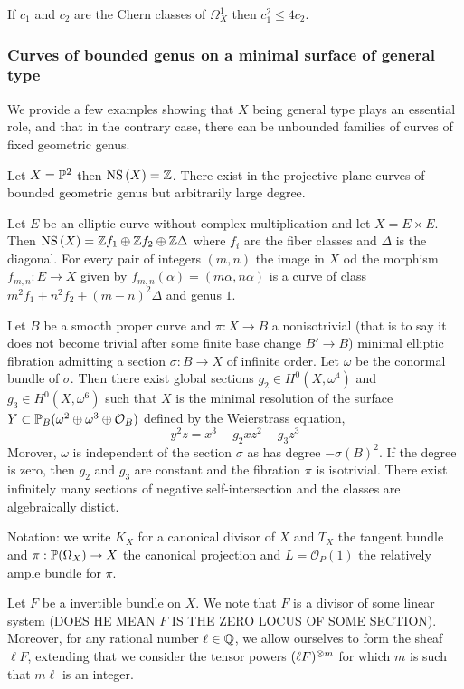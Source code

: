 \documentclass[12pt]{article}
\newcommand{\cO}{\mathcal{O}}
\begin{document}
\begin{cor}
If $c_1$ and $c_2$ are the Chern classes of $\Omega^1_X$ then $c_1^2 \le 4 c_2$. 
\end{cor}

\subsubsection{Curves of bounded genus on a minimal surface of general type}

We provide a few examples showing that $X$ being general type plays an essential role, and that in the contrary case, there can be unbounded families of curves of fixed geometric genus.

\begin{example}
Let $X = \P^2$ then $\NS{X} = \Z$. There exist in the projective plane curves of bounded geometric genus but arbitrarily large degree.
\end{example} 

\begin{example}
Let $E$ be an elliptic curve without complex multiplication and let $X = E \times E$. Then $\NS{X} = \Z f_1 \oplus \Z f_2 \oplus \Z \Delta$ where $f_i$ are the fiber classes and $\Delta$ is the diagonal. For every pair of integers $(m, n)$ the image in $X$ od the morphism $f_{m,n} : E \to X$ given by $f_{m,n}(\alpha) = (m \alpha, n \alpha)$ is a curve of class $m^2 f_1 + n^2 f_2 + (m-n)^2 \Delta$ and genus $1$.
\end{example}

\begin{example}
Let $B$ be a smooth proper curve and $\pi : X \to B$ a nonisotrivial (that is to say it does not become trivial after some finite base change $B' \to B$) minimal elliptic fibration admitting a section $\sigma : B \to X$ of infinite order. Let $\omega$ be the conormal bundle of $\sigma$. Then there exist global sections $g_2 \in H^0(X, \omega^4)$ and $g_3 \in H^0(X, \omega^6)$ such that $X$ is the minimal resolution of the surface $Y \subset \P_B(\omega^2 \oplus \omega^3 \oplus \cO_B)$ defined by the Weierstrass equation,
\[ y^2 z = x^3 - g_2 x z^2 - g_3 z^3 \]
Morover, $\omega$ is independent of the section $\sigma$ as has degree $- \sigma(B)^2$. If the degree is zero, then $g_2$ and $g_3$ are constant and the fibration $\pi$ is isotrivial. There exist infinitely many sections of negative self-intersection and the classes are algebraically distict. 
\end{example}

Notation: we write $K_X$ for a canonical divisor of $X$ and $T_X$ the tangent bundle and $\pi : \P(\Omega_X) \to X$ the canonical projection and $L = \cO_P(1)$ the relatively ample bundle for $\pi$.
\par 
Let $F$ be a invertible bundle on $X$. We note that $F$ is a divisor of some linear system (DOES HE MEAN $F$ IS THE ZERO LOCUS OF SOME SECTION). Moreover, for any rational number $\ell \in \QQ$, we allow ourselves to form the sheaf $\ell F$, extending that we consider the tensor powers $(\ell F)^{\ot m}$ for which $m$ is such that $m \ell$ is an integer.
\end{document}
